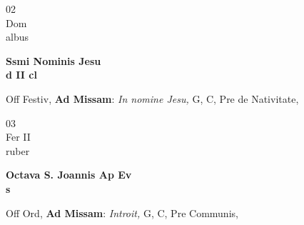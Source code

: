 \documentclass[10pt, openany]{book}
\begin{document}
        \begin{center}
            \begin{minipage}{3.5in}
                \vspace{2em}
                \begin{minipage}{0.5in}
                    {\Huge 02} \\
                    {\normalsize Dom} \\
                    {\normalsize albus}
                \end{minipage}
                \begin{minipage}{3.0in}
                    \textbf{ \large Ssmi Nominis Jesu \\
                    \textnormal{\normalsize d II cl}} \\ 
                \end{minipage}
                \begin{justify}Off Festiv, \textbf{Ad Missam}: \textit{In nomine Jesu,} G, C, Pre de Nativitate,   
                \end{justify}
            \end{minipage}
        \end{center}
    
        \begin{center}
            \begin{minipage}{3.5in}
                \vspace{2em}
                \begin{minipage}{0.5in}
                    {\Huge 03} \\
                    {\normalsize Fer II} \\
                    {\normalsize ruber}
                \end{minipage}
                \begin{minipage}{3.0in}
                    \textbf{ \large Octava S. Joannis Ap Ev \\
                    \textnormal{\normalsize s}} \\ 
                \end{minipage}
                \begin{justify}Off Ord, \textbf{Ad Missam}: \textit{Introit,} G, C, Pre Communis,   
                \end{justify}
            \end{minipage}
        \end{center}
    
\end{document}
